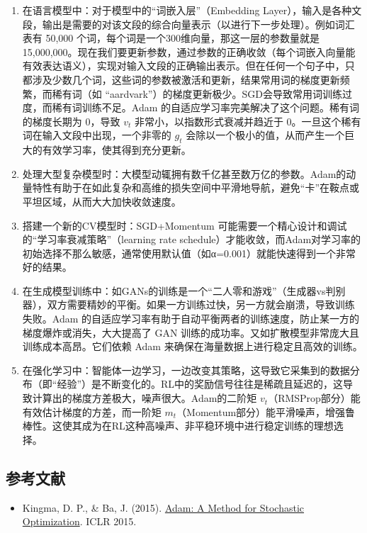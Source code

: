 \begin{enumerate}
\def\labelenumi{\arabic{enumi}.}
\item
  在语言模型中：对于模型中的``词嵌入层''（Embedding Layer），输入是各种文段，输出是需要的对该文段的综合向量表示（以进行下一步处理）。例如词汇表有 50,000 个词，每个词是一个300维向量，那这一层的参数量就是15,000,000。现在我们要更新参数，通过参数的正确收敛（每个词嵌入向量能有效表达语义），实现对输入文段的正确输出表示。但在任何一个句子中，只都涉及少数几个词，这些词的参数被激活和更新，结果常用词的梯度更新频繁，而稀有词（如 ``aardvark''）的梯度更新极少。SGD会导致常用词训练过度，而稀有词训练不足。Adam 的自适应学习率完美解决了这个问题。稀有词的梯度长期为 \(0\)，导致 \(v_t\) 非常小，以指数形式衰减并趋近于 \(0\)。一旦这个稀有词在输入文段中出现，一个非零的 \(g_t\) 会除以一个极小的值，从而产生一个巨大的有效学习率，使其得到充分更新。
\item
  处理大型复杂模型时：大模型动辄拥有数千亿甚至数万亿的参数。Adam的动量特性有助于在如此复杂和高维的损失空间中平滑地导航，避免``卡''在鞍点或平坦区域，从而大大加快收敛速度。
\item
  搭建一个新的CV模型时：SGD+Momentum 可能需要一个精心设计和调试的``学习率衰减策略''（learning rate schedule）才能收敛，而Adam对学习率的初始选择不那么敏感，通常使用默认值（如α=0.001）就能快速得到一个非常好的结果。
\item
  在生成模型训练中：如GANs的训练是一个``二人零和游戏''（生成器vs判别器），双方需要精妙的平衡。如果一方训练过快，另一方就会崩溃，导致训练失败。Adam 的自适应学习率有助于自动平衡两者的训练速度，防止某一方的梯度爆炸或消失，大大提高了 GAN 训练的成功率。又如扩散模型非常庞大且训练成本高昂。它们依赖 Adam 来确保在海量数据上进行稳定且高效的训练。
\item
  在强化学习中：智能体一边学习，一边改变其策略，这导致它采集到的数据分布（即``经验''）是不断变化的。RL中的奖励信号往往是稀疏且延迟的，这导致计算出的梯度方差极大，噪声很大。Adam的二阶矩 \(v_t\)（RMSProp部分）能有效估计梯度的方差，而一阶矩 \(m_t\)（Momentum部分）能平滑噪声，增强鲁棒性。这使其成为在RL这种高噪声、非平稳环境中进行稳定训练的理想选择。
\end{enumerate}

\hypertarget{ux53c2ux8003ux6587ux732e-28}{%
\subsection{参考文献}\label{ux53c2ux8003ux6587ux732e-28}}

\vspace{0.25em}
\begin{itemize}
\tightlist
\item
  Kingma, D. P., \& Ba, J. (2015). \href{https://arxiv.org/abs/1412.6980}{Adam: A Method for Stochastic Optimization}. ICLR 2015.
\end{itemize}

